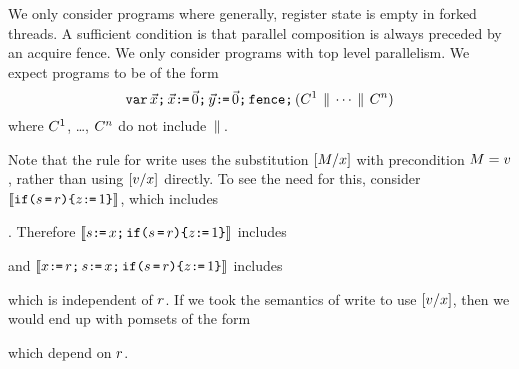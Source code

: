 We only consider programs where generally, register state is empty in forked
threads.  A sufficient condition is that parallel composition is always
preceded by an acquire fence.  We only consider programs with top level
parallelism.  We expect programs to be of the form
\begin{displaymath}
  \texttt{var}\,\vec{x}\texttt{;}\,
  \vec{x}\texttt{:}\mkern-1mu\texttt{=}\,\vec{0}\texttt{;}\,
  \vec{y}\texttt{:}\mkern-1mu\texttt{=}\,\vec{0}\texttt{;}\,
  \texttt{fence}\texttt{;}\,
  (C^1 \,\mathbin{\|}\, \cdots \,\mathbin{\|}\, C^n)
\end{displaymath}
where $C^1$, \ldots, $C^n$ do not include $\,\mathbin{\|}\,$.  



Note that the rule for write uses the substitution $[M/x]$ with
precondition $M=v$, rather than using $[v/x]$ directly.
To see the need for this, consider
$\llbracket\texttt{if}\allowbreak\texttt{(}s\,\texttt{=}\,r\texttt{)}\allowbreak\texttt{\{} z\texttt{:}\mkern-1mu\texttt{=}\, 1\texttt{\}}\rrbracket$,
which includes
\begin{tikzinline}[node distance=1em]
\end{tikzinline}.
Therefore
$\llbracket s\texttt{:}\mkern-1mu\texttt{=}\,x\texttt{;}\,\texttt{if}\allowbreak\texttt{(}s\,\texttt{=}\,r\texttt{)}\allowbreak\texttt{\{} z\texttt{:}\mkern-1mu\texttt{=}\, 1\texttt{\}}\rrbracket$
includes
\begin{tikzinline}[node distance=1em]
\end{tikzinline}
and
$\llbracket x\texttt{:}\mkern-1mu\texttt{=}\,r\texttt{;}\,s\texttt{:}\mkern-1mu\texttt{=}\,x\texttt{;}\,\texttt{if}\allowbreak\texttt{(}s\,\texttt{=}\,r\texttt{)}\allowbreak\texttt{\{} z\texttt{:}\mkern-1mu\texttt{=}\, 1\texttt{\}}\rrbracket$
includes
\begin{tikzinline}[node distance=1em]
\end{tikzinline}
which is independent of $r$.
%
If we took the semantics of write to use $[v/x]$, then we would end
up with pomsets of the form
\begin{tikzinline}[node distance=1em]
\end{tikzinline}
which depend on $r$.

